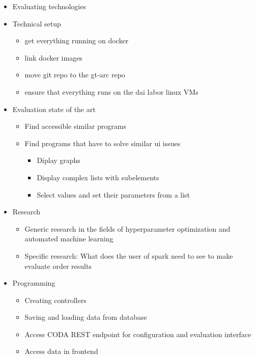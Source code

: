 \documentclass[12pt,a4paper,titlepage,oneside,BCOR1cm]{scrreprt}
\begin{document}
\begin{itemize}
\item Evaluating technologies

\item Technical setup
\begin {itemize}
\item get everything running on docker
\item link docker images
\item move git repo to the gt-arc repo
\item ensure that everything runs on the dai labor linux VMs
\end{itemize}
\item Evaluation state of the art
\begin{itemize}
\item Find accessible similar programs
\item Find programs that have to solve similar ui issues
\begin{itemize}
\item Diplay graphs
\item Display complex lists with subelements
\item Select values and set their parameters from a list
\end{itemize}
\end{itemize}

\item Research
\begin{itemize}
\item Generic research in the fields of hyperparameter optimization and automated machine learning
\item Specific research: What does the user of spark need to see to make evaluate order results
\end{itemize}

\item Programming
\begin{itemize}
\item Creating controllers
\item Saving and loading data from database
\item Access CODA REST endpoint for configuration and evaluation interface
\item Access data in frontend


\end{itemize}
\end{itemize}
\end{document}
